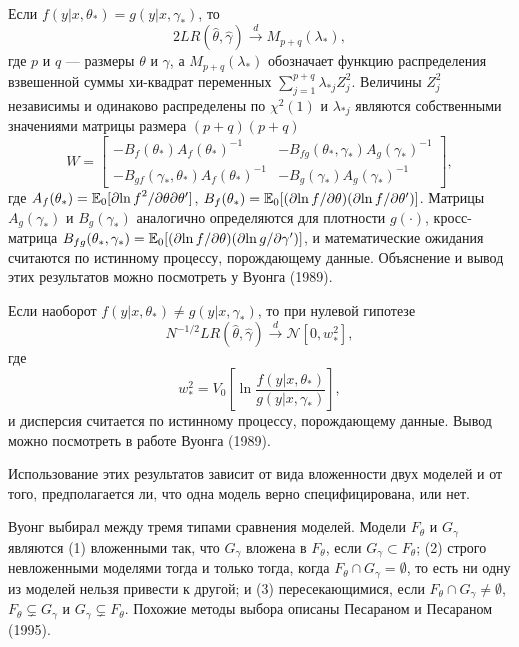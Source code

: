 Если $f(y|x, \theta_*) = g(y|x, \gamma_*)$, то
\begin{equation}
2LR(\hat{\theta}, \hat{\gamma}) \stackrel{d}{\rightarrow} M_{p + q}(\lambda_*),
\end{equation}
где $p$ и $q$ --- размеры $\theta$ и $\gamma$, а $M_{p + q}(\lambda_*)$ обозначает функцию распределения взвешенной суммы хи-квадрат переменных $\sum_{j=1}^{p+q} \lambda_{*j}Z_j^2$. Величины $Z_j^2$ независимы и одинаково распределены по $\chi^2(1)$ и $\lambda_{*j}$ являются собственными значениями матрицы размера $(p+q)(p+q)$
\begin{equation}
W = \begin{bmatrix} -B_f(\theta_*)A_f(\theta_*)^{-1} & -B_{fg}(\theta_*, \gamma_*)A_g(\gamma_*)^{-1} \\ -B_{gf}(\gamma_*,\theta_*)A_f(\theta_*)^{-1} & -B_g(\gamma_*)A_g(\gamma_*)^{-1} \end{bmatrix},
\end{equation}
где $A_f(\theta_*) = \mathbb{E}_0[\partial{\ln f}^2/\partial{\theta}\partial{\theta}']$, $B_f(\theta_*) = \mathbb{E}_0[(\partial{\ln f}/\partial{\theta})(\partial{\ln f}/\partial{\theta}')]$. Матрицы $A_g(\gamma_*)$ и $B_g(\gamma_*)$ аналогично определяются для плотности $g(\cdot)$, кросс-матрица $B_{fg}(\theta_*, \gamma_*) = \mathbb{E}_0[(\partial{\ln f}/\partial{\theta})(\partial{\ln g}/\partial{\gamma}')]$, и математические ожидания считаются по истинному процессу, порождающему данные. Объяснение и вывод этих результатов можно посмотреть у Вуонга (1989).

Если наоборот $f(y|x, \theta_*) \not= g(y|x, \gamma_*)$, то при нулевой гипотезе
\begin{equation}
N^{-1/2}LR(\hat{\theta},\hat{\gamma}) \stackrel{d}{\rightarrow} \mathcal{N}[0, w_*^2],
\end{equation}
где
\begin{equation}
w_*^2 = V_0 \left[ \ln \frac{f(y|x, \theta_*)}{g(y|x, \gamma_*)} \right],
\end{equation}
и дисперсия считается по истинному процессу, порождающему данные. Вывод можно посмотреть в работе Вуонга (1989).

Использование этих результатов зависит от вида вложенности двух моделей и от того, предполагается ли, что одна модель верно специфицирована, или нет.

Вуонг выбирал между тремя типами сравнения моделей. Модели $F_{\theta}$ и $G_{\gamma}$ являются (1) вложенными так, что $G_{\gamma}$ вложена в $F_{\theta}$, если $G_{\gamma} \subset F_{\theta}$; (2) строго невложенными моделями тогда и только тогда, когда $F_{\theta} \cap G_{\gamma} = \emptyset$, то есть ни одну из моделей нельзя привести к другой; и (3) пересекающимися, если $F_{\theta} \cap G_{\gamma} \not= \emptyset$, $F_{\theta} \varsubsetneq G_{\gamma}$ и $G_{\gamma} \varsubsetneq F_{\theta}$. Похожие методы выбора описаны Песараном и Песараном (1995).

